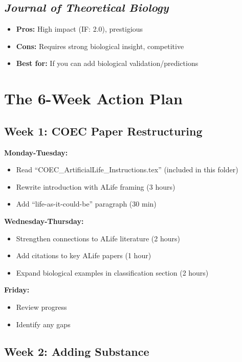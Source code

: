 \documentclass[11pt]{article}
\begin{document}
\subsection{\textit{Journal of Theoretical Biology}}
\begin{itemize}[leftmargin=*]
    \item \textbf{Pros:} High impact (IF: 2.0), prestigious
    \item \textbf{Cons:} Requires strong biological insight, competitive
    \item \textbf{Best for:} If you can add biological validation/predictions
\end{itemize}

\section{The 6-Week Action Plan}

\subsection*{Week 1: COEC Paper Restructuring}

\textbf{Monday-Tuesday:}
\begin{itemize}[leftmargin=*]
    \item Read ``COEC\_ArtificialLife\_Instructions.tex'' (included in this folder)
    \item Rewrite introduction with ALife framing (3 hours)
    \item Add ``life-as-it-could-be'' paragraph (30 min)
\end{itemize}

\textbf{Wednesday-Thursday:}
\begin{itemize}[leftmargin=*]
    \item Strengthen connections to ALife literature (2 hours)
    \item Add citations to key ALife papers (1 hour)
    \item Expand biological examples in classification section (2 hours)
\end{itemize}

\textbf{Friday:}
\begin{itemize}[leftmargin=*]
    \item Review progress
    \item Identify any gaps
\end{itemize}

\subsection*{Week 2: Adding Substance}
\end{document}
